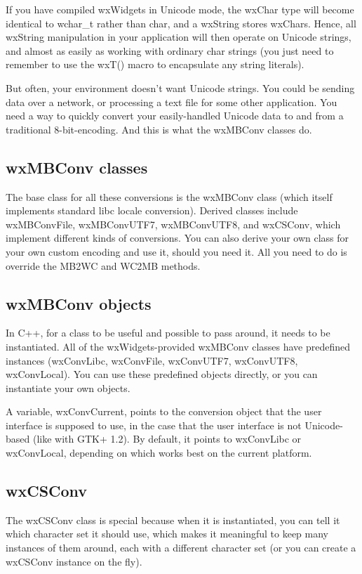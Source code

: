 If you have compiled wxWidgets in Unicode mode, the wxChar type will become
identical to wchar\_t rather than char, and a wxString stores wxChars. Hence,
all wxString manipulation in your application will then operate on Unicode
strings, and almost as easily as working with ordinary char strings (you
just need to remember to use the wxT() macro to encapsulate any string
literals).

But often, your environment doesn't want Unicode strings. You could be sending
data over a network, or processing a text file for some other application. You
need a way to quickly convert your easily-handled Unicode data to and from a
traditional 8-bit-encoding. And this is what the wxMBConv classes do.

\subsection{wxMBConv classes}

The base class for all these conversions is the wxMBConv class (which itself
implements standard libc locale conversion). Derived classes include
wxMBConvFile, wxMBConvUTF7, wxMBConvUTF8, and wxCSConv, which implement
different kinds of conversions. You can also derive your own class for your
own custom encoding and use it, should you need it. All you need to do is
override the MB2WC and WC2MB methods.

\subsection{wxMBConv objects}

In C++, for a class to be useful and possible to pass around, it needs to be
instantiated. All of the wxWidgets-provided wxMBConv classes have predefined
instances (wxConvLibc, wxConvFile, wxConvUTF7, wxConvUTF8, wxConvLocal).
You can use these predefined objects directly, or you can instantiate your own
objects.

A variable, wxConvCurrent, points to the conversion object that the user interface
is supposed to use, in the case that the user interface is not Unicode-based (like
with GTK+ 1.2). By default, it points to wxConvLibc or wxConvLocal, depending on
which works best on the current platform.

\subsection{wxCSConv}

The wxCSConv class is special because when it is instantiated, you can tell it
which character set it should use, which makes it meaningful to keep many
instances of them around, each with a different character set (or you can
create a wxCSConv instance on the fly).


